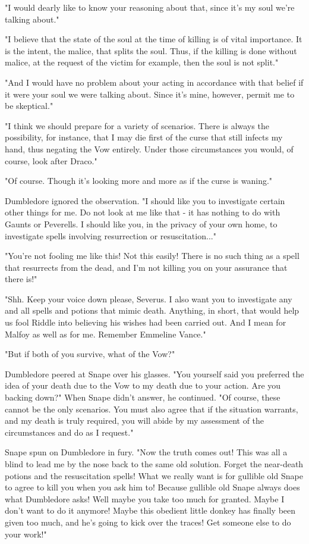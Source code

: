 "I would dearly like to know your reasoning about that, since it's my soul we're talking about."

"I believe that the state of the soul at the time of killing is of vital importance. It is the intent, the malice, that splits the soul. Thus, if the killing is done without malice, at the request of the victim for example, then the soul is not split."

"And I would have no problem about your acting in accordance with that belief if it were your soul we were talking about. Since it's mine, however, permit me to be skeptical."

"I think we should prepare for a variety of scenarios. There is always the possibility, for instance, that I may die first of the curse that still infects my hand, thus negating the Vow entirely. Under those circumstances you would, of course, look after Draco."

"Of course. Though it's looking more and more as if the curse is waning."

Dumbledore ignored the observation. "I should like you to investigate certain other things for me. Do not look at me like that - it has nothing to do with Gaunts or Peverells. I should like you, in the privacy of your own home, to investigate spells involving resurrection or resuscitation..."

"You're not fooling me like this! Not this easily! There is no such thing as a spell that resurrects from the dead, and I'm not killing you on your assurance that there is!"

"Shh. Keep your voice down please, Severus. I also want you to investigate any and all spells and potions that mimic death. Anything, in short, that would help us fool Riddle into believing his wishes had been carried out. And I mean for Malfoy as well as for me. Remember Emmeline Vance."

"But if both of you survive, what of the Vow?"

Dumbledore peered at Snape over his glasses. "You yourself said you preferred the idea of your death due to the Vow to my death due to your action. Are you backing down?" When Snape didn't answer, he continued. "Of course, these cannot be the only scenarios. You must also agree that if the situation warrants, and my death is truly required, you will abide by my assessment of the circumstances and do as I request."

Snape spun on Dumbledore in fury. "Now the truth comes out! This was all a blind to lead me by the nose back to the same old solution. Forget the near-death potions and the resuscitation spells! What we really want is for gullible old Snape to agree to kill you when you ask him to! Because gullible old Snape always does what Dumbledore asks! Well maybe you take too much for granted. Maybe I don't want to do it anymore! Maybe this obedient little donkey has finally been given too much, and he's going to kick over the traces! Get someone else to do your work!"

